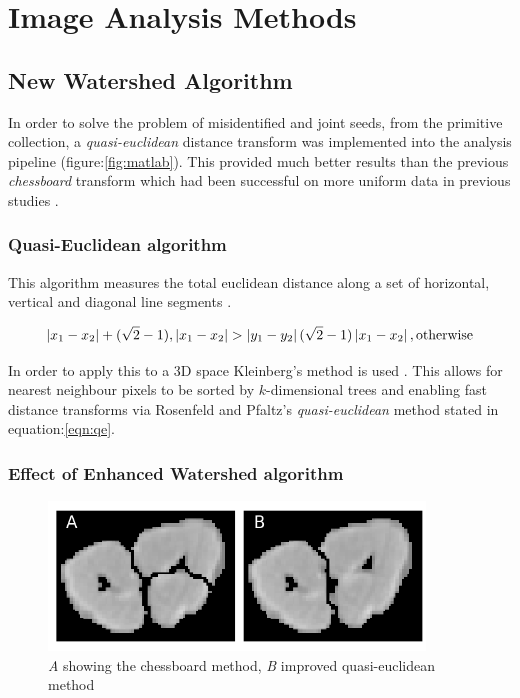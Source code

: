 \documentclass[11pt]{report}
\begin{document}
\section{Image Analysis Methods}
\label{sec-3-2}
\subsection{New Watershed Algorithm}
\label{sec-3-2-1}

In order to solve the problem of misidentified and joint seeds, from the primitive collection,
a  \emph{quasi-euclidean} distance transform was implemented into the analysis pipeline (figure:\ref{fig:matlab}). This provided much better results than the previous
\emph{chessboard} transform which had been successful on more uniform data in previous studies \cite{Hughes2017}.

\subsubsection{Quasi-Euclidean algorithm}
\label{sec-3-2-1-1}

This algorithm measures the total euclidean distance along a set of horizontal, vertical and diagonal
line segments \cite{Pfaltz1966}.

\begin{equation}
\label{eqn:qe}
\left | x_1 - x_2 \right | + (\sqrt{2}-1), \left | x_1 - x_2 \right | >\left | y_1 - y_2 \right | (\sqrt{2}-1) \left | x_1 - x_2 \right | ,\textup{otherwise}
\end{equation}


In order to apply this to a 3D space Kleinberg's method is used  \cite{Kleinberg1997}. This allows for nearest neighbour pixels to be sorted by $k$-dimensional trees
and enabling fast distance transforms via Rosenfeld and Pfaltz's \emph{quasi-euclidean} method stated in equation:\ref{eqn:qe}.
\subsubsection{Effect of Enhanced Watershed algorithm}
\label{sec-3-2-1-2}
\begin{center}
\begin{figure}[htb]
\centering
\includegraphics[width=10cm]{./images/chess_quasi.png}
\caption{\label{fig:qe}\emph{A} showing the chessboard method, \emph{B} improved quasi-euclidean method}
\end{figure}
\end{center}
\end{document}
